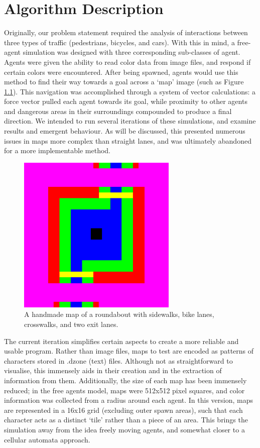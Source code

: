 \chapter{Algorithm Description} \label{chap:algorithm}

Originally, our problem statement required the analysis of interactions between three types of traffic (pedestrians, bicycles, and cars). With this in mind, a free-agent simulation was designed with three corresponding sub-classes of agent. Agents were given the ability to read color data from image files, and respond if certain colors were encountered. After being spawned, agents would use this method to find their way towards a goal across a ‘map’ image (such as Figure \ref{fig:map-roundabout}). This navigation was accomplished through a system of vector calculations: a force vector pulled each agent towards its goal, while proximity to other agents and dangerous areas in their surroundings compounded to produce a final direction. We intended to run several iterations of these simulations, and examine results and emergent behaviour. As will be discussed, this presented numerous issues in maps more complex than straight lanes, and was ultimately abandoned for a more implementable method.

\begin{figure}[h]
    \centering
    \includegraphics[width=3in]{images/map-roundabout.png}
    \caption{A handmade map of a roundabout with sidewalks, bike lanes, crosswalks, and two exit lanes.}
    \label{fig:map-roundabout}
\end{figure}

The current iteration simplifies certain aspects to create a more reliable and usable program. Rather than image files, maps to test are encoded as patterns of characters stored in .dzone (text) files. Although not as straightforward to visualise, this immensely aids in their creation and in the extraction of information from them. Additionally, the size of each map has been immensely reduced; in the free agents model, maps were 512x512 pixel squares, and color information was collected from a radius around each agent. In this version, maps are represented in a 16x16 grid (excluding outer spawn areas), such that each character acts as a distinct ‘tile’ rather than a piece of an area. This brings the simulation away from the idea freely moving agents, and somewhat closer to a cellular automata approach.

